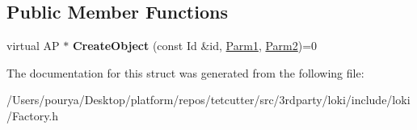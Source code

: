 \subsection*{Public Member Functions}
\begin{DoxyCompactItemize}
\item 
\hypertarget{structLoki_1_1FactoryImpl_3_01AP_00_01Id_00_01LOKI__TYPELIST__2_07P1_00_01P2_08_4_a45753daa42b46cc67532b806986986f7}{}virtual A\+P $\ast$ {\bfseries Create\+Object} (const Id \&id, \hyperlink{classLoki_1_1EmptyType}{Parm1}, \hyperlink{classLoki_1_1EmptyType}{Parm2})=0\label{structLoki_1_1FactoryImpl_3_01AP_00_01Id_00_01LOKI__TYPELIST__2_07P1_00_01P2_08_4_a45753daa42b46cc67532b806986986f7}

\end{DoxyCompactItemize}


The documentation for this struct was generated from the following file\+:\begin{DoxyCompactItemize}
\item 
/\+Users/pourya/\+Desktop/platform/repos/tetcutter/src/3rdparty/loki/include/loki/Factory.\+h\end{DoxyCompactItemize}
